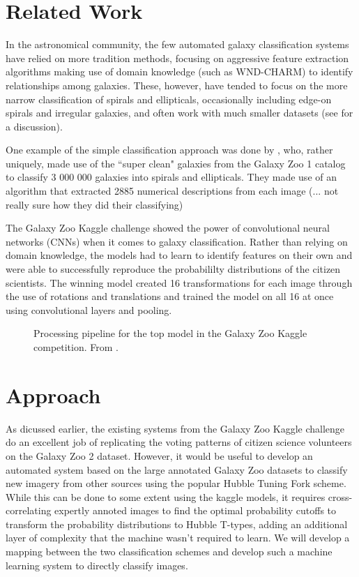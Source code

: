 \documentclass[twocolumn]{aastex6}
\begin{document}
\section{Related Work}
In the astronomical community, the few automated galaxy classification systems have relied on more tradition methods, focusing on aggressive feature extraction algorithms making use of domain knowledge (such as WND-CHARM) to identify relationships among galaxies. These, however, have tended to focus on the more narrow classification of spirals and ellipticals, occasionally including edge-on spirals and irregular galaxies, and often work with much smaller datasets (see \citealt{2015MNRAS.450.1441D} for a discussion).

One example of the simple classification approach was done by \cite{2016ApJS..223...20K}, who, rather uniquely, made use of the ``super clean" galaxies from the Galaxy Zoo 1 catalog \citep{2008MNRAS.389.1179L} to classify 3 000 000 galaxies into spirals and ellipticals. They made use of an algorithm that extracted 2885 numerical descriptions from each image (... not really sure how they did their classifying)

The Galaxy Zoo Kaggle challenge showed the power of convolutional neural networks (CNNs) when it comes to galaxy classification. Rather than relying on domain knowledge, the models had to learn to identify features on their own and were able to successfully reproduce the probabililty distributions of the citizen scientists. The winning model created 16 transformations for each image through the use of rotations and translations and trained the model on all 16 at once using convolutional layers and pooling.

\begin{figure*}[!t]
\caption{Processing pipeline for the top model in the Galaxy Zoo Kaggle competition. From \cite{2015MNRAS.450.1441D}.}
\end{figure*}

\cite{2015MNRAS.450.1441D}


\section{Approach}
As dicussed earlier, the existing systems from the Galaxy Zoo Kaggle challenge do an excellent job of replicating the voting patterns of citizen science volunteers on the Galaxy Zoo 2 dataset. However, it would be useful to develop an automated system based on the large annotated Galaxy Zoo datasets to classify new imagery from other sources using the popular Hubble Tuning Fork scheme. While this can be done to some extent using the kaggle models, it requires cross-correlating expertly annoted images to find the optimal probability cutoffs to transform the probability distributions to Hubble T-types, adding an additional layer of complexity that the machine wasn't required to learn. We will develop a mapping between the two classification schemes and develop such a machine learning system to directly classify images. 
\end{document}
